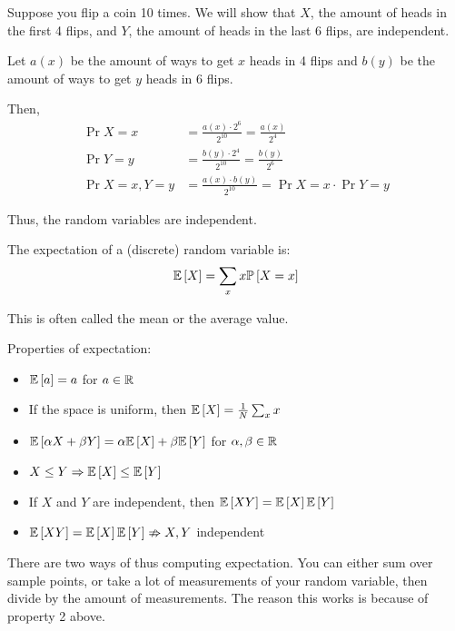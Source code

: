 \begin{example}
    Suppose you flip a coin 10 times.
    We will show that $X$, the amount of heads in the first 4 flips, and $Y$, the amount
    of heads in the last 6 flips, are independent.

    Let $a(x)$ be the amount of ways to get $x$ heads in 4 flips and $b(y)$ be the amount
    of ways to get $y$ heads in 6 flips.

    Then,
    \begin{align*}
        \Pr{X=x} &= \frac{a(x) \cdot 2^6}{2^{10}} = \frac{a(x)}{2^4} \\
        \Pr{Y=y} &= \frac{b(y) \cdot 2^4}{2^{10}} = \frac{b(y)}{2^6} \\
        \Pr{X=x, Y=y} &= \frac{a(x) \cdot b(y)}{2^{10}} = \Pr{X=x} \cdot \Pr{Y=y} 
    \end{align*}

    Thus, the random variables are independent.
\end{example}
\begin{definition} [Expectation]
    The expectation of a (discrete) random variable is:
    \[ \mathbb{E}\left[ X \right] = \sum_{x} x \mathbb{P}\left[ X = x \right] \]
\end{definition}

This is often called the mean or the average value.

\begin{theorem}
    Properties of expectation:
    \begin{itemize}
        \item $\mathbb{E}\left[ a \right] = a$ for $a \in \operatorname{\mathbb{R}}$
        \item If the space is uniform, then $\mathbb{E}\left[ X \right] = \frac{1}{N} \sum_{x} x$
        \item $\mathbb{E}\left[ \alpha X + \beta Y \right] = \alpha \mathbb{E}\left[ X \right] + \beta \mathbb{E}\left[ Y \right]$ for $\alpha, \beta \in \operatorname{\mathbb{R}}$
        \item $X \leq Y \Rightarrow \mathbb{E}\left[ X \right] \leq \mathbb{E}\left[ Y \right]$
        \item If $X$ and $Y$ are independent, then $\mathbb{E}\left[ XY \right] = \mathbb{E}\left[ X \right] \mathbb{E}\left[ Y \right]$
        \item $\mathbb{E}\left[ XY \right] = \mathbb{E}\left[ X \right] \mathbb{E}\left[ Y \right] \nRightarrow X, Y$ independent
    \end{itemize}
\end{theorem}

There are two ways of thus computing expectation. You can either sum over sample points, or take
a lot of measurements of your random variable, then divide by the amount of measurements. The reason this works is
because of property 2 above.


